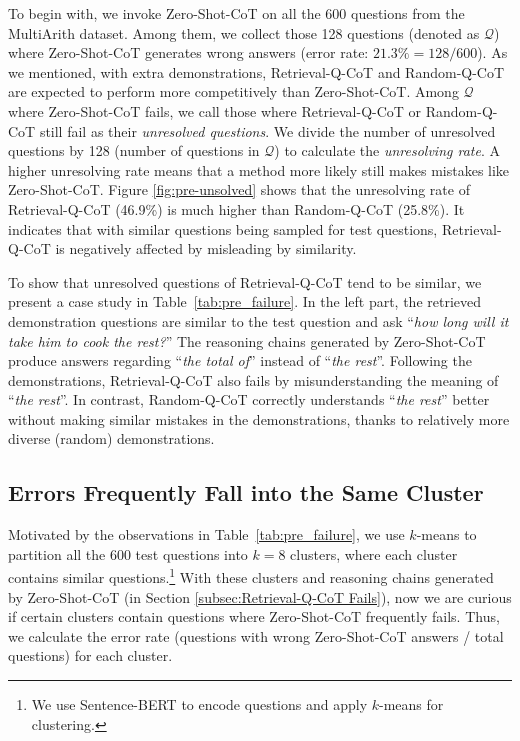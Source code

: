 To begin with, we invoke Zero-Shot-CoT on all the 600 questions from the MultiArith dataset. Among them, we collect those 128 questions (denoted as $\mathcal{Q}$) where Zero-Shot-CoT generates  wrong answers (error rate: $21.3\% = 128/600$). 
As we mentioned, with extra demonstrations, Retrieval-Q-CoT and Random-Q-CoT are expected to perform more competitively than Zero-Shot-CoT.
Among $\mathcal{Q}$ where Zero-Shot-CoT fails, we call those where Retrieval-Q-CoT or Random-Q-CoT still fail as their \textit{unresolved questions}. 
We divide the number of unresolved questions by 128 (number of questions in $\mathcal{Q}$) to calculate the \textit{unresolving rate}. A higher unresolving rate means that a method more likely still makes mistakes like Zero-Shot-CoT.
Figure \ref{fig:pre-unsolved} shows that the unresolving rate of Retrieval-Q-CoT (46.9\%) is much higher than Random-Q-CoT (25.8\%). 
It indicates that 
with similar questions being sampled for test questions,
Retrieval-Q-CoT is negatively affected by misleading by similarity.

To show that
unresolved questions of Retrieval-Q-CoT
tend to be similar,
we present a case study in Table~\ref{tab:pre_failure}. In the left part, the retrieved demonstration questions are similar to the test question and ask  ``\textit{how long will it take him to cook the rest?}'' The reasoning chains generated by Zero-Shot-CoT produce answers regarding ``\textit{the total of}'' instead of ``\textit{the rest}''. Following the demonstrations, Retrieval-Q-CoT also fails by misunderstanding the meaning of ``\textit{the rest}''. In contrast, Random-Q-CoT correctly understands ``\textit{the rest}'' better without making similar mistakes in the demonstrations, thanks to relatively more diverse (random) demonstrations. 

\subsection{Errors Frequently Fall into the Same Cluster}

Motivated by the observations in Table~\ref{tab:pre_failure}, we use $k$-means to partition all the 600 test questions into $k=8$ clusters, where each cluster contains similar questions.\footnote{We use Sentence-BERT \citep{reimers-2019-sentence-bert} to encode questions and apply $k$-means for clustering.} With these clusters
and reasoning chains generated by Zero-Shot-CoT (in Section \ref{subsec:Retrieval-Q-CoT Fails}), now we are curious if certain clusters contain 
questions where Zero-Shot-CoT frequently fails.
Thus, we calculate the error rate (questions with wrong Zero-Shot-CoT answers / total questions) for each cluster.

